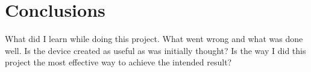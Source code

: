 \documentclass[10pt,a4paper]{article}
\begin{document}
\pagebreak
\section{Conclusions}
What did I learn while doing this project. What went wrong and what was done well. Is the device created as useful as was initially thought? Is the way I did this project the most effective way to achieve the intended result? 

\pagebreak


\end{document}
